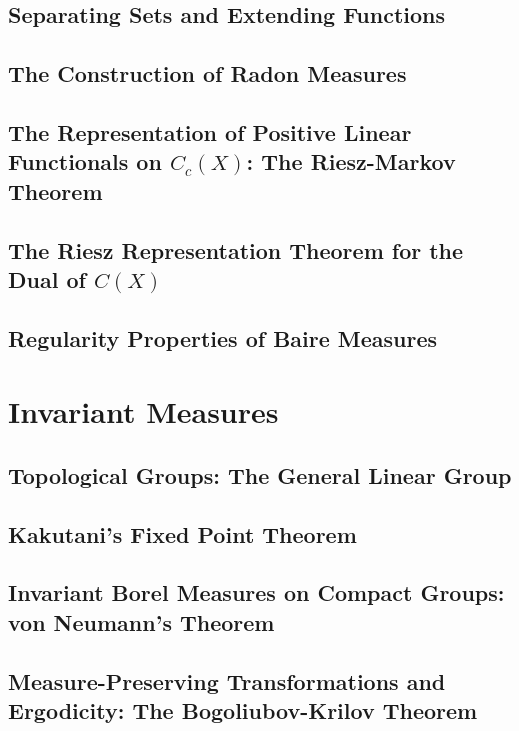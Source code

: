 \documentclass[a4paper,10pt]{book}
\theoremstyle{plain} %
\begin{document}
\section{Separating Sets and Extending Functions}
\section{The Construction of Radon Measures}
\section{The Representation of Positive Linear Functionals on $C_c(X)$: The Riesz-Markov Theorem}
\section{The Riesz Representation Theorem for the Dual of $C(X)$}
\section{Regularity Properties of Baire Measures}

\chapter{Invariant Measures}

\section{Topological Groups: The General Linear Group}
\section{Kakutani's Fixed Point Theorem}
\section{Invariant Borel Measures on Compact Groups: von Neumann's Theorem}
\section{Measure-Preserving Transformations and Ergodicity: The Bogoliubov-Krilov Theorem}
\end{document}
